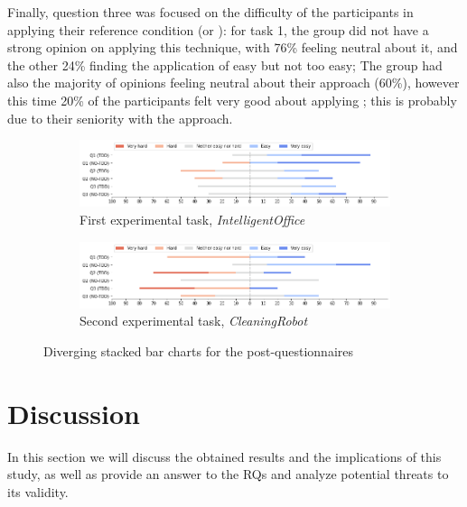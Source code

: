 Finally, question three was focused on the difficulty of the participants in applying their reference condition (\ie \tdd or \notdd): for task 1, the \tdd group did not have a strong opinion on applying this technique, with 76\% feeling neutral about it, and the other 24\% finding the application of \tdd easy but not too easy; The \notdd group had also the majority of opinions feeling neutral about their approach (60\%), however this time 20\% of the participants felt very good about applying \notdd; this is probably due to their seniority with the approach.


\begin{figure}[htbp]
    \begin{subfigure}{\textwidth}
        \includegraphics[width=\textwidth]{figures/bar_charts/task1.png}
        \caption{First experimental task, \textit{IntelligentOffice}}
    \end{subfigure}
    
    \bigskip
    
    \begin{subfigure}{\textwidth}
        \includegraphics[width=\textwidth]{figures/bar_charts/task2.png}
        \caption{Second experimental task, \textit{CleaningRobot}}
    \end{subfigure}
    
    \caption{Diverging stacked bar charts for the post-questionnaires}
    \label{bar_charts}
\end{figure}



\section{Discussion}
In this section we will discuss the obtained results and the implications of this study, as well as provide an answer to the RQs and analyze potential threats to its validity.

